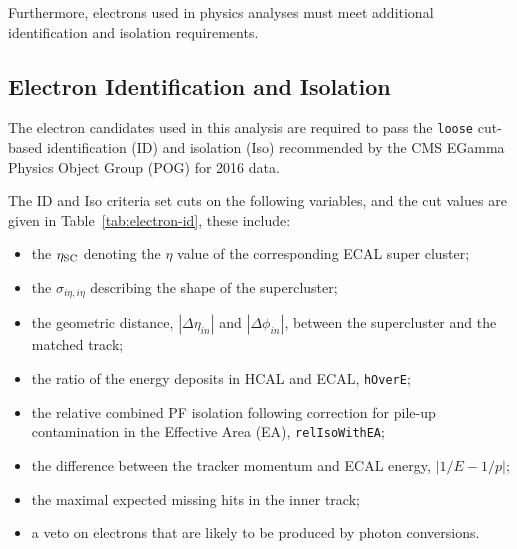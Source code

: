 \vspace{0.3cm}
Furthermore, electrons used in physics analyses must meet additional identification and isolation requirements.

\subsection{Electron Identification and Isolation}\label{sec:ob_eidiso}
The electron candidates used in this analysis are required to pass the \texttt{loose} cut-based identification (ID) and isolation (Iso) recommended by the CMS EGamma Physics Object Group (POG) for 2016 data.

\vspace{0.3cm}
The ID and Iso criteria set cuts on the following variables, and the cut values are given in Table~\ref{tab:electron-id}, these include:

\begin{itemize}%
\item the $\eta_{\rm SC}$ denoting the $\eta$ value of the corresponding ECAL super cluster;
\item the $\sigma_{i\eta,i\eta}$ describing the shape of the supercluster;
\item the geometric distance, $|\Delta\eta_{in}|$ and $|\Delta\phi_{in}|$, between the supercluster and the matched track;
\item the ratio of the energy deposits in HCAL and ECAL, \texttt{hOverE};
\item the relative combined PF isolation following correction for
  pile-up contamination in the
  Effective Area (EA), \texttt{relIsoWithEA}; %
\item the difference between the tracker momentum and ECAL energy, $|1/E-1/p|$;
\item the maximal expected missing hits in the inner track;
\item a veto on electrons that are likely to be produced by photon conversions.
\end{itemize}



